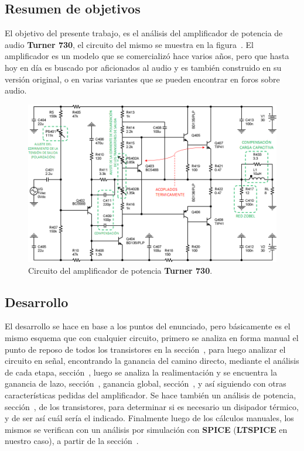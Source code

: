 
\subsection{Resumen de objetivos}

El objetivo del presente trabajo, es el análisis del amplificador de potencia de audio \textbf{Turner 730}, el circuito del mismo se muestra en la figura~. El amplificador es un modelo que se comercializó hace varios años, pero que hasta hoy en día es buscado por aficionados al audio y es también construido en su versión original, o en varias variantes que se pueden encontrar en foros sobre audio.


\begin{figure}[H] %
\begin{center}
\includegraphics[width=0.9 \textwidth, angle=0]{./img/desarrollo/0_circuito_propuesto.png}
\caption{\label{fig:fig_complete_real_circuit}\footnotesize{Circuito del amplificador de potencia \textbf{Turner 730}.}}
\end{center}
\end{figure}




\subsection{Desarrollo}


El desarrollo se hace en base a los puntos del enunciado, pero básicamente es el mismo esquema que con cualquier circuito, primero se analiza en forma manual el punto de reposo de todos los transistores en la sección~, para luego analizar el circuito en señal, encontrando la ganancia del camino directo, mediante el análisis de cada etapa, sección~, luego se analiza la realimentación y se encuentra la ganancia de lazo, sección~, ganancia global, sección~, y así siguiendo con otras características pedidas del amplificador. Se hace también un análisis de potencia, sección~, de los transistores, para determinar si es necesario un disipador térmico, y de ser así cuál sería el indicado. Finalmente luego de los cálculos manuales, los mismos se verifican con un análisis por simulación con \textbf{SPICE} (\textbf{LTSPICE} en nuestro caso), a partir de la sección~.






\clearpage